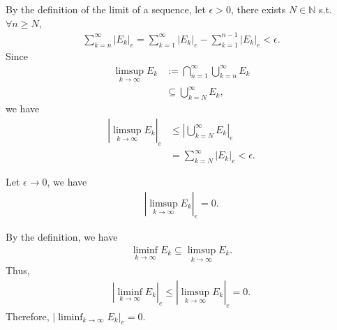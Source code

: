\documentclass[UTF8,a4paper,10pt]{article}
\begin{document}
  \begin{solution}

  By the definition of the limit of a sequence, let \(\epsilon>0\), there exists \(N\in \mathbb{N}\) s.t. \(\forall n\geq N\),
  \begin{equation*}
    \begin{aligned}
      \sum_{k=n}^{\infty}|E_k|_e = \sum_{k=1}^{\infty}|E_k|_e - \sum_{k=1}^{n-1}|E_k|_e < \epsilon.
    \end{aligned}
  \end{equation*}
Since
  \begin{equation*}
    \begin{aligned}
      \limsup_{k\to\infty}E_k &:= \bigcap_{n=1}^{\infty}  \bigcup_{k=n}^{\infty} E_k\\
      &\subseteq \bigcup_{k=N}^{\infty} E_k,
    \end{aligned}
  \end{equation*}
  we have
  \begin{equation*}
    \begin{aligned}
      |\limsup_{k\to\infty}E_k|_e&\leq |\bigcup_{k=N}^{\infty} E_k|_e\\
      &=\sum_{k=N}^{\infty}|E_k|_e <\epsilon.
    \end{aligned}
  \end{equation*}

  Let \(\epsilon\to 0\), we have
  \begin{equation*}
    \begin{aligned}
      |\limsup_{k\to\infty}E_k|_e=0.
    \end{aligned}
  \end{equation*}

  \dotfill

  By the definition, we have
  \begin{equation*}
    \begin{aligned}
      \liminf_{k\to\infty}E_k \subseteq \limsup_{k\to\infty}E_k.
    \end{aligned}
  \end{equation*}
Thus, 
\begin{equation*}
  \begin{aligned}
    |\liminf_{k\to\infty}E_k|_e \leq |\limsup_{k\to\infty}E_k|_e = 0.
  \end{aligned}
\end{equation*}
Therefore, \( |\liminf_{k\to\infty}E_k|_e = 0\).


  \end{solution}
\end{document}
